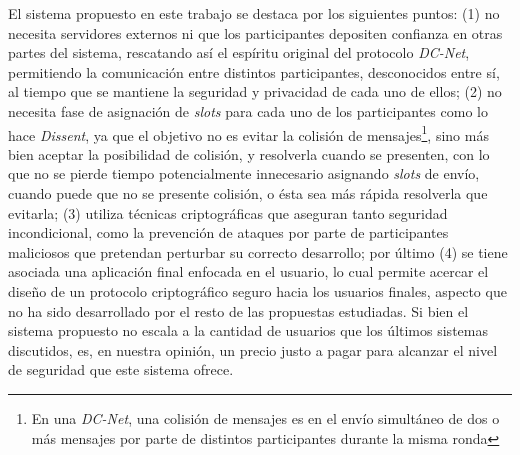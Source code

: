 El sistema propuesto en este trabajo se destaca por los siguientes puntos: (1) 
no necesita servidores externos ni que los participantes depositen confianza 
en otras partes del sistema, rescatando así el espíritu original del protocolo 
\emph{DC-Net}, permitiendo la comunicación entre distintos participantes, 
desconocidos entre sí, al tiempo que se mantiene la seguridad y privacidad 
de cada uno de ellos; (2) no necesita fase de asignación de \emph{slots} para 
cada uno de los participantes como lo hace \emph{Dissent}, ya que el objetivo 
no es evitar la colisión de mensajes\footnote{En una \emph{DC-Net}, una 
colisión de mensajes es en el envío simultáneo de dos o más mensajes por parte 
de distintos participantes durante la misma ronda}, sino más bien aceptar la 
posibilidad de colisión, y resolverla cuando se presenten, con lo que no se 
pierde tiempo potencialmente innecesario asignando \emph{slots} de envío, 
cuando puede que no se presente colisión, o ésta sea más rápida resolverla que 
evitarla; (3) utiliza técnicas criptográficas que aseguran tanto seguridad 
incondicional, como la prevención de ataques por parte de participantes 
maliciosos que pretendan perturbar su correcto desarrollo; por último (4) se 
tiene asociada una aplicación final enfocada en el usuario, lo cual permite 
acercar el diseño de un protocolo criptográfico seguro hacia los usuarios 
finales, aspecto que no ha sido desarrollado por el resto de las propuestas 
estudiadas. Si bien el sistema propuesto no escala a la cantidad de usuarios 
que los últimos sistemas discutidos, es, en nuestra opinión, un precio justo a 
pagar para alcanzar el nivel de seguridad que este sistema ofrece.
